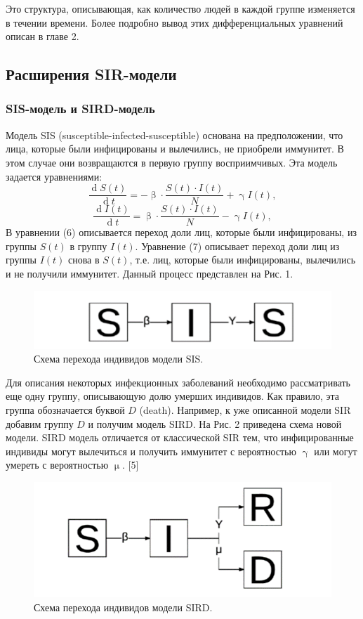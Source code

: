\documentclass[a4paper, 12pt]{extarticle}
\numberwithin{equation}{section}
\renewcommand{\beta}{\upbeta}
\renewcommand{\gamma}{\upgamma}
\renewcommand{\mu}{\upmu}
\renewcommand{\d}{\operatorname{d}}
\begin{document}
	Это структура, описывающая, как количество людей в каждой группе изменяется в течении времени. Более подробно вывод этих дифференциальных уравнений описан в главе 2.
	\subsection{Расширения SIR-модели}
	\subsubsection{SIS-модель и SIRD-модель}
	Модель SIS (susceptible-infected-susceptible) основана на предположении, что лица, которые были инфицированы и вылечились, не приобрели
	иммунитет. В этом случае они возвращаются в первую группу восприимчивых. Эта модель задается уравнениями:
	\begin{equation}
		\dfrac{\d S(t)}{\d t} = - \beta\cdot  \dfrac{S(t)\cdot I(t)}{N} + \gamma I(t),
	\end{equation}
	\begin{equation}
		\dfrac{\d I(t)}{\d t} = \beta\cdot  \dfrac{S(t)\cdot I(t)}{N} - \gamma I(t),
	\end{equation}
	В уравнении (6) описывается переход доли лиц, которые были инфицированы, из группы $S(t)$ в группу $I(t)$. Уравнение (7) описывает переход
	доли лиц из группы $I(t)$ снова в $S(t)$, т.е. лиц, которые были инфицированы, вылечились и не получили иммунитет. Данный процесс представлен на Рис. 1.
	\begin{figure}[h]
		\centering
		\includegraphics[scale=0.5]{images/img02}
		\caption{Схема перехода индивидов модели SIS.}
		\label{fig:img02}
	\end{figure}
	Для описания некоторых инфекционных заболеваний необходимо рассматривать еще одну группу, описывающую долю умерших индивидов. Как правило, эта группа обозначается буквой $D$ (death). Например, к уже описанной модели SIR добавим группу $D$ и получим модель SIRD. На Рис. 2
	приведена схема новой модели. SIRD модель отличается от классической SIR тем, что инфицированные индивиды могут вылечиться и получить иммунитет с вероятностью $\gamma$ или могут умереть с вероятностью $\mu$. [5]
	\begin{figure}[h]
		\centering
		\includegraphics[scale=0.5]{images/img03}
		\caption{Схема перехода индивидов модели SIRD.}
		\label{fig:img03}
	\end{figure}
	
\end{document}
